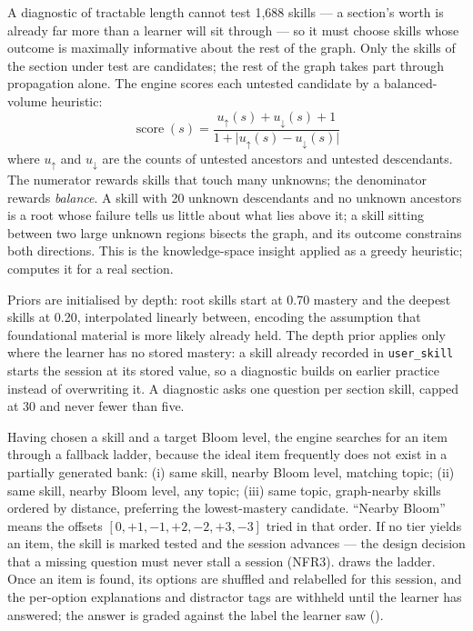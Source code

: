 A diagnostic of tractable length cannot test 1{,}688 skills --- a section's
worth is already far more than a learner will sit through --- so it must choose
skills whose outcome is maximally informative about the rest of the graph. Only
the skills of the section under test are candidates; the rest of the graph takes
part through propagation alone. The engine scores each untested candidate by a
balanced-volume heuristic:
\begin{equation}
  \operatorname{score}(s) =
  \frac{u_{\uparrow}(s) + u_{\downarrow}(s) + 1}
       {1 + \lvert u_{\uparrow}(s) - u_{\downarrow}(s) \rvert}
  \label{eq:selection}
\end{equation}
where $u_{\uparrow}$ and $u_{\downarrow}$ are the counts of untested ancestors
and untested descendants. The numerator rewards skills that touch many unknowns;
the denominator rewards \emph{balance}. A skill with 20 unknown descendants and
no unknown ancestors is a root whose failure tells us little about what lies
above it; a skill sitting between two large unknown regions bisects the graph,
and its outcome constrains both directions. This is the knowledge-space insight
\cite{doignon1985spaces} applied as a greedy heuristic; 
computes it for a real section.



Priors are initialised by depth: root skills start at 0.70 mastery and the
deepest skills at 0.20, interpolated linearly between, encoding the assumption
that foundational material is more likely already held. The depth prior applies
only where the learner has no stored mastery: a skill already recorded in
\texttt{user\_skill} starts the session at its stored value, so a diagnostic
builds on earlier practice instead of overwriting it. A diagnostic asks one
question per section skill, capped at 30 and never fewer than five.

Having chosen a skill and a target Bloom level, the engine searches for an item
through a fallback ladder, because the ideal item frequently does not exist in
a partially generated bank: (i) same skill, nearby Bloom level, matching topic;
(ii) same skill, nearby Bloom level, any topic; (iii) same topic, graph-nearby
skills ordered by distance, preferring the lowest-mastery candidate. ``Nearby
Bloom'' means the offsets $[0,+1,-1,+2,-2,+3,-3]$ tried in that order. If no
tier yields an item, the skill is marked tested and the session advances --- the
design decision that a missing question must never stall a session (NFR3).
 draws the ladder. Once an item is found, its options
are shuffled and relabelled for this session, and the per-option explanations
and distractor tags are withheld until the learner has answered; the answer is
graded against the label the learner saw ().

